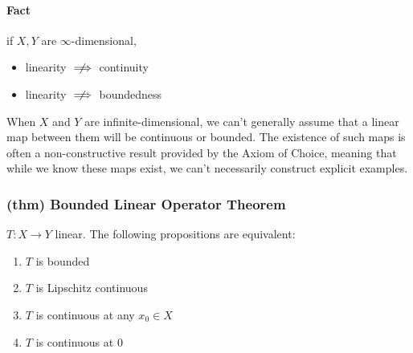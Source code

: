 \paragraph{Fact} if $X,Y$ are $\infty$-dimensional,
\begin{itemize}
    \item linearity $\centernot\implies $ continuity
    \item linearity $\centernot \implies $ boundedness
\end{itemize}
When $X$ and $Y$ are infinite-dimensional, we can’t generally assume that a linear map between them will be continuous or bounded. The existence of such maps is often a non-constructive result provided by the Axiom of Choice, meaning that while we know these maps exist, we can’t necessarily construct explicit examples.
\subsubsection{(thm) Bounded Linear Operator Theorem}
$T:X\to Y$ linear. The following propositions are equivalent:
\begin{enumerate}
    \item $T$ is bounded
    \item $T$ is Lipschitz continuous
    \item $T$ is continuous at any $x_0\in X$
    \item $T$ is continuous at $0$
\end{enumerate}
